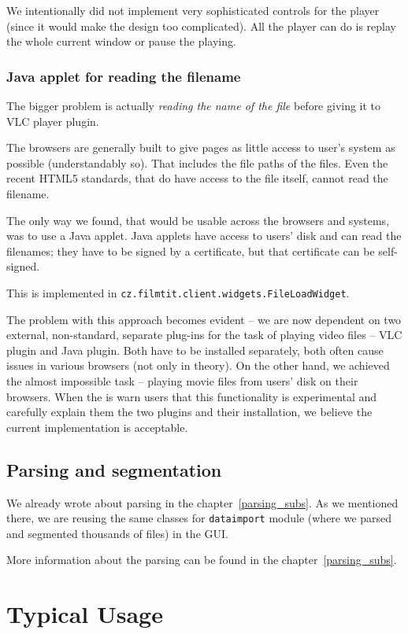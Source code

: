 We intentionally did not implement very sophisticated controls for the player (since it would make the design too complicated). All the player can do is replay the whole current window or pause the playing.

\subsubsection*{Java applet for reading the filename}
The bigger problem is actually \emph{reading the name of the file} before giving it to VLC player plugin.

The browsers are generally built to give pages as little access to user's system as possible (understandably so). That includes the file paths of the files. Even the recent HTML5 standards, that do have access to the file itself, cannot read the filename.

The only way we found, that would be usable across the browsers and systems, was to use a Java applet. Java applets have access to users' disk and can read the filenames; they have to be signed by a certificate, but that certificate can be self-signed.

This is implemented in \texttt{cz.filmtit.client.widgets.FileLoadWidget}.

The problem with this approach becomes evident -- we are now dependent on two external, non-standard, separate plug-ins for the task of playing video files -- VLC plugin and Java plugin. Both have to be installed separately, both often cause issues in various browsers (not only in theory). On the other hand, we achieved the almost impossible task -- playing movie files from users' disk on their browsers. When the is warn users that this functionality is experimental and carefully explain them the two plugins and their installation, we believe the current implementation is acceptable.


\subsection{Parsing and segmentation}
We already wrote about parsing in the chapter~\ref{parsing_subs}. As we mentioned there, we are reusing the same classes for {\tt dataimport} module (where we parsed and segmented thousands of files) in the GUI.

More information about the parsing can be found in the chapter~\ref{parsing_subs}.

\section{Typical Usage}

